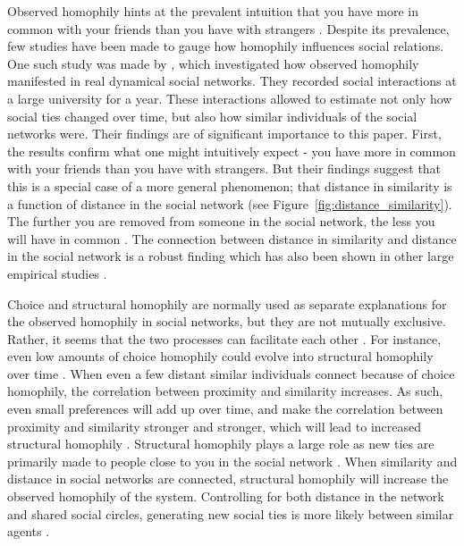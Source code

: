 \documentclass[11pt]{article}
\begin{document}
\noindent Observed homophily hints at the prevalent intuition that you have more in common with your friends than you have with strangers \cite{mcpherson_birds_2001}.
Despite its prevalence, few studies have been made to gauge how homophily influences social relations. One such study was made by , which investigated how observed homophily manifested in real dynamical social networks. They recorded social interactions at a large university for a year. These interactions allowed  to estimate not only how social ties changed over time, but also how similar individuals of the social networks were. Their findings are of significant importance to this paper. First, the results confirm what one might intuitively expect - you have more in common with your friends than you have with strangers. But their findings suggest that this is a special case of a more general phenomenon; that distance in similarity is a function of distance in the social network (see Figure~\ref{fig:distance_similarity}). The further you are removed from someone in the social network, the less you will have in common \cite{kossinets_origins_2009}. 
The connection between distance in similarity and distance in the social network is a robust finding which has also been shown in other large empirical studies \cite{bener_empirical_2016,crandall_feedback_2008}.

\noindent Choice and structural homophily are normally used as separate explanations for the observed homophily in social networks, but they are not mutually exclusive. Rather, it seems that the two processes can facilitate each other \cite{asikainen_cumulative_2020}. For instance, even low amounts of choice homophily could evolve into structural homophily over time \cite{asikainen_cumulative_2020,kossinets_origins_2009,taylor_exploring_2018}. When even a few distant similar individuals connect because of choice homophily, the correlation between proximity and similarity increases. As such, even small preferences will add up over time, and make the correlation between proximity and similarity stronger and stronger, which will lead to increased structural homophily \cite{kossinets_origins_2009}. 
Structural homophily plays a large role as new ties are primarily made to people close to you in the social network \cite{bianconi_triadic_2014, peixoto_disentangling_2022}. When similarity and distance in social networks are connected, structural homophily will increase the observed homophily of the system. Controlling for both distance in the network and shared social circles, generating new social ties is more likely between similar agents \cite{kossinets_origins_2009, bener_empirical_2016}.
\end{document}
